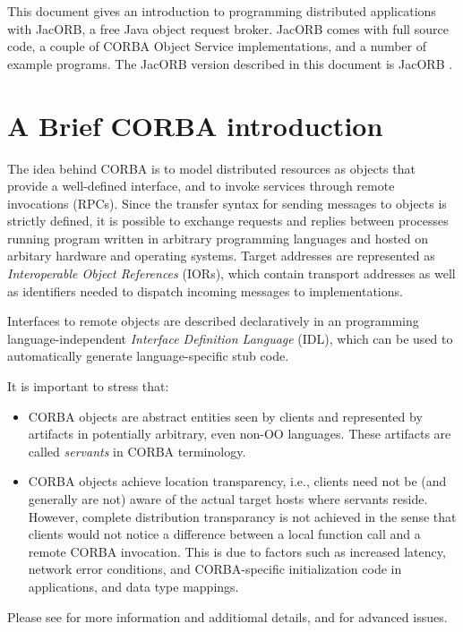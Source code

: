 %
%

This document gives an introduction to programming distributed
applications with JacORB, a free Java object request broker. JacORB
comes with full source code, a couple of CORBA Object Service
implementations, and a number of example programs.  The JacORB version
described in this document is JacORB \JacORBVersion.

\section{A Brief CORBA introduction}

The idea behind CORBA is to model distributed resources as objects
that provide a well-defined interface, and to invoke services through
remote invocations (RPCs). Since the transfer syntax for
sending messages to objects is strictly defined, it is possible to
exchange requests and replies between processes running program
written in arbitrary programming languages and hosted on arbitary
hardware and operating systems. Target addresses are represented as
{\em Interoperable Object References} (IORs), which contain transport
addresses as well as identifiers needed to dispatch incoming messages
to implementations. 

Interfaces to remote objects are described declaratively in an
programming language-independent {\em Interface Definition Language}
(IDL), which can be used to automatically generate language-specific
stub code.

It is important to stress that:
\begin{itemize}
\item CORBA objects are abstract entities  seen by clients and
  represented by artifacts in potentially arbitrary, even non-OO
  languages. These artifacts are called {\em servants} in CORBA
  terminology.
\item CORBA objects achieve location transparency, i.e., clients need
  not be (and generally are not) aware of the actual target hosts
  where servants reside. However, complete distribution transparancy
  is not achieved in the sense that clients would not notice a
  difference between a local function call and a remote CORBA
  invocation. This is due to factors such as increased latency,
  network error conditions, and CORBA-specific initialization code in
  applications, and data type mappings.
\end{itemize}

Please see \cite{Brose2001a,Siegel2000, Vinoski1997} for more
information and additiomal details, and \cite{Henning1999} for
advanced issues.

